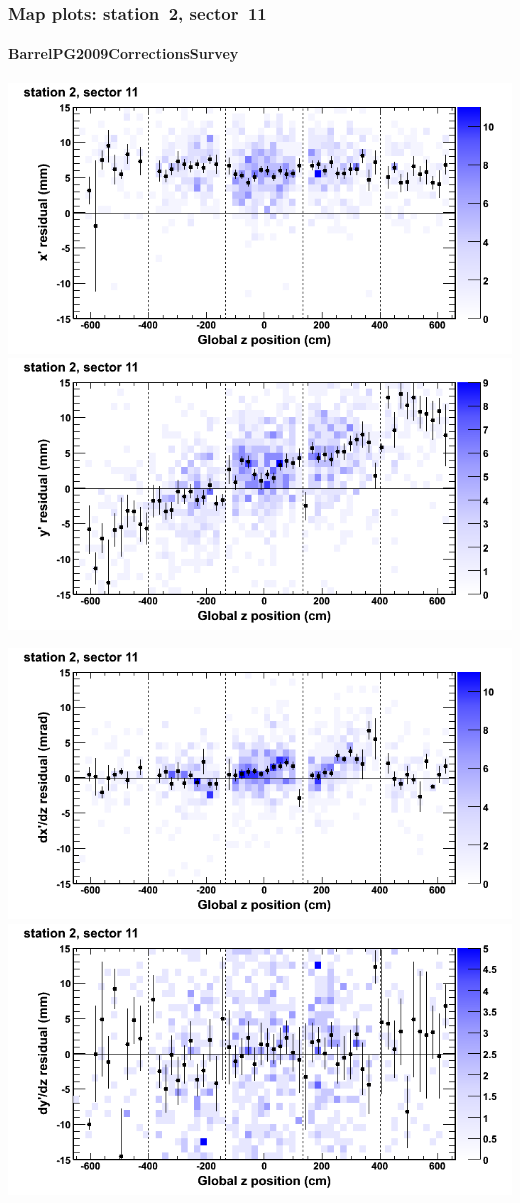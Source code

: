 \documentclass[compress]{beamer}
\begin{document}
\begin{frame}
\frametitle{Map plots: station~2, sector~11}
\framesubtitle{BarrelPG2009CorrectionsSurvey}
\includegraphics[width=0.5\linewidth]{mapplots_01/DTvsz_st2sec11_x.png}
\includegraphics[width=0.5\linewidth]{mapplots_01/DTvsz_st2sec11_y.png}

\includegraphics[width=0.5\linewidth]{mapplots_01/DTvsz_st2sec11_dxdz.png}
\includegraphics[width=0.5\linewidth]{mapplots_01/DTvsz_st2sec11_dydz.png}
\end{frame}
\end{document}

